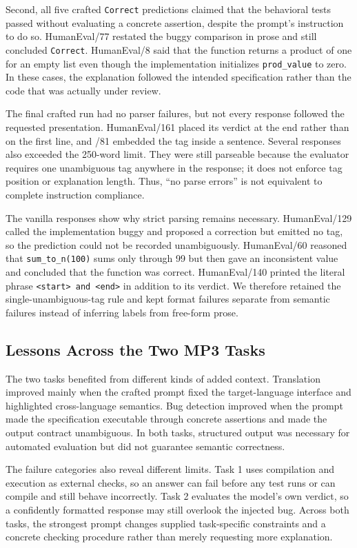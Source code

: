 \documentclass[sigconf,nonacm]{acmart}
\begin{document}
Second, all five crafted \texttt{Correct} predictions claimed that the
behavioral tests passed without evaluating a concrete assertion, despite the
prompt's instruction to do so. HumanEval/77 restated the buggy comparison in
prose and still concluded \texttt{Correct}. HumanEval/8 said that the function
returns a product of one for an empty list even though the implementation
initializes \texttt{prod\_value} to zero. In these cases, the explanation
followed the intended specification rather than the code that was actually
under review.

The final crafted run had no parser failures, but not every response followed
the requested presentation. HumanEval/161 placed its verdict at the end rather
than on the first line, and /81 embedded the tag inside a sentence. Several
responses also exceeded the 250-word limit. They were still parseable because
the evaluator requires one unambiguous tag anywhere in the response; it does
not enforce tag position or explanation length. Thus, ``no parse errors'' is
not equivalent to complete instruction compliance.

The vanilla responses show why strict parsing remains necessary. HumanEval/129
called the implementation buggy and proposed a correction but emitted no tag,
so the prediction could not be recorded unambiguously. HumanEval/60 reasoned
that \texttt{sum\_to\_n(100)} sums only through 99 but then gave an inconsistent
value and concluded that the function was correct. HumanEval/140 printed the
literal phrase \texttt{<start> and <end>} in addition to its verdict. We
therefore retained the single-unambiguous-tag rule and kept format failures
separate from semantic failures instead of inferring labels from free-form
prose.

\subsection{Lessons Across the Two MP3 Tasks}

The two tasks benefited from different kinds of added context. Translation
improved mainly when the crafted prompt fixed the target-language interface and
highlighted cross-language semantics. Bug detection improved when the prompt
made the specification executable through concrete assertions and made the
output contract unambiguous. In both tasks, structured output was necessary
for automated evaluation but did not guarantee semantic correctness.

The failure categories also reveal different limits. Task 1 uses compilation
and execution as external checks, so an answer can fail before any test runs or
can compile and still behave incorrectly. Task 2 evaluates the model's own
verdict, so a confidently formatted response may still overlook the injected
bug. Across both tasks, the strongest prompt changes supplied task-specific
constraints and a concrete checking procedure rather than merely requesting
more explanation.

\ifmpthreestandalone
  
\end{document}
